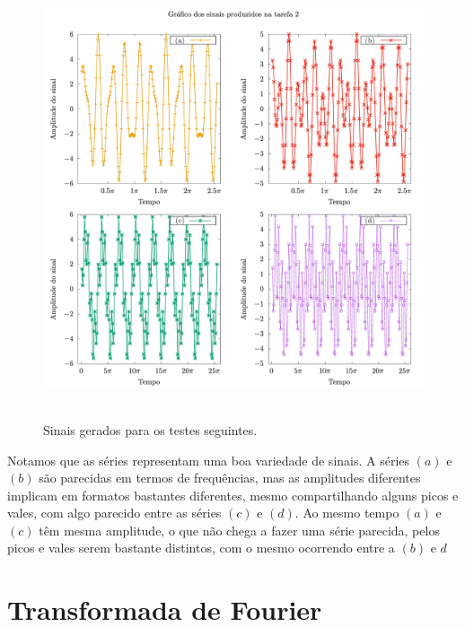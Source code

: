 \documentclass[11pt]{article}
\begin{document}
\begin{figure}[htbp]
\centering
\includegraphics[width=13cm,height=13cm]{graficos/tarefa-2-graf-11820833.jpg}
\caption{Sinais gerados para os testes seguintes.}
\end{figure}

Notamos que as séries representam uma boa variedade de sinais.
A séries \((a)\) e \((b)\) são parecidas em termos de frequências, mas as amplitudes diferentes implicam em formatos bastantes diferentes, mesmo compartilhando alguns picos e vales, com algo parecido entre as séries \((c)\) e \((d)\).
Ao mesmo tempo \((a)\) e \((c)\) têm mesma amplitude, o que não chega a fazer uma série parecida, pelos picos e vales serem bastante distintos, com o mesmo ocorrendo entre a \((b)\) e \({d}\)


\section*{Transformada de Fourier}
\label{sec:orgae7ed45}
\end{document}
